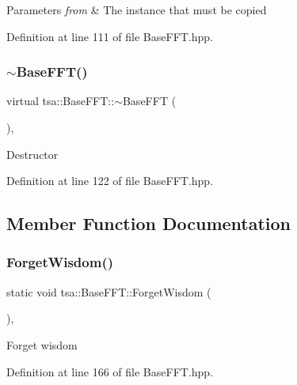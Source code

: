 \begin{DoxyParams}{Parameters}
{\em from} & The instance that must be copied \\
\hline
\end{DoxyParams}


Definition at line 111 of file Base\+F\+F\+T.\+hpp.

\mbox{\label{classtsa_1_1_base_f_f_t_ad73b78693c83ef6c7e07701965ae8cb6}} 
\subsubsection{\texorpdfstring{$\sim$\+Base\+F\+F\+T()}{~BaseFFT()}}
{\footnotesize\ttfamily virtual tsa\+::\+Base\+F\+F\+T\+::$\sim$\+Base\+F\+FT (\begin{DoxyParamCaption}{ }\end{DoxyParamCaption})\hspace{0.3cm}{\ttfamily [inline]}, {\ttfamily [virtual]}}

Destructor 

Definition at line 122 of file Base\+F\+F\+T.\+hpp.



\subsection{Member Function Documentation}
\mbox{\label{classtsa_1_1_base_f_f_t_a7069819e421ad4cb2a4c58f65c8540ea}} 
\subsubsection{\texorpdfstring{Forget\+Wisdom()}{ForgetWisdom()}}
{\footnotesize\ttfamily static void tsa\+::\+Base\+F\+F\+T\+::\+Forget\+Wisdom (\begin{DoxyParamCaption}{ }\end{DoxyParamCaption})\hspace{0.3cm}{\ttfamily [inline]}, {\ttfamily [static]}}

Forget wisdom 

Definition at line 166 of file Base\+F\+F\+T.\+hpp.

